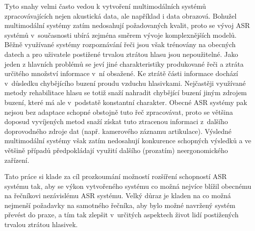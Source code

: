 Tyto snahy velmi často vedou
k vytvoření multimodálních systémů zpracovávajících nejen akustická data, ale
například i data obrazová. %
Bohužel multimodální systémy zatím nedosahují požadovaných kvalit, proto se vývoj ASR systémů v~současnosti ubírá zejména směrem vývoje komplexnějších modelů.
Běžně využívané systémy rozpoznávání řeči jsou však trénovány na obecných datech a pro uživatele postižené trvalou ztrátou hlasu jsou nepoužitelné. Jako jeden z hlavních problémů se jeví jiné charakteristiky produkované řeči a ztráta určitého množství informace v~ní obsažené. Ke ztrátě části informace dochází v~důsledku chybějícího buzení  proudu vzduchu hlasivkami. Nejčastěji využívané metody rehabilitace hlasu se totiž snaží nahradit chybějící buzení  jiným zdrojem buzení, které má ale v~podstatě konstantní charakter. Obecné ASR systémy pak nejsou bez adaptace schopné obstojně tuto řeč zpracovávat, proto se většina doposud vyvíjených metod snaží získat tuto ztracenou informaci z~dalšího doprovodného zdroje dat (např. kamerového záznamu artikulace). Výsledné multimodální systémy však zatím nedosahují konkurence schopných výsledků a ve většině případů předpokládají využití dalšího (prozatím) neergonomického zařízení.

Tato práce si klade za cíl prozkoumání možností rozšíření schopností ASR systému tak, aby se výkon vytvořeného systému co možná nejvíce blížil obecnému na řečníkovi nezávislému ASR systému. Velký důraz je kladen na co možná nejmenší požadavky na samotného řečníka, aby bylo možné navržený systém převést do praxe, a tím tak zlepšit v~určitých aspektech život lidí postižených trvalou ztrátou hlasivek.


